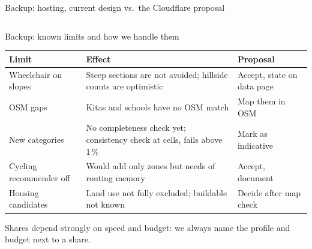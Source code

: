 \documentclass[aspectratio=169,10pt]{beamer}
\begin{document}
\begin{frame}{Backup: hosting, current design vs.\ the Cloudflare proposal}
  \begin{columns}[T,onlytextwidth]
      \par\smallskip
      \hostingcurrent
      \par\smallskip
      \hostingproposed
  \end{columns}
\end{frame}

\begin{frame}{Backup: known limits and how we handle them}
  \footnotesize
  \begin{tabular}{@{}P{32mm}P{62mm}P{34mm}@{}}
    \toprule
    Limit & Effect & Proposal \\
    \midrule
    Wheelchair on slopes & Steep sections are not avoided; hillside counts are optimistic
      & Accept, state on data page \\
    OSM gaps & \factVTwoKitaMissing{} Kitas and \factVTwoSchoolMissing{} schools have no OSM
      match & Map them in OSM \\
    New categories & No completeness check yet; consistency check at \factCurMonoCells{}
      cells, fails above 1\,\% & Mark as indicative \\
    Cycling recommender off & Would add only \factCyclingZones{} zones but needs
      \factCyclingValhallaPeak{} of routing memory & Accept, document \\
    Housing candidates & Land use not fully excluded; buildable not known & Decide after
      map check \\
    \bottomrule
  \end{tabular}
  \par\medskip
  {\footnotesize\color{muted}Shares depend strongly on speed and budget: we always name the
  profile and budget next to a share.}
\end{frame}
\end{document}
